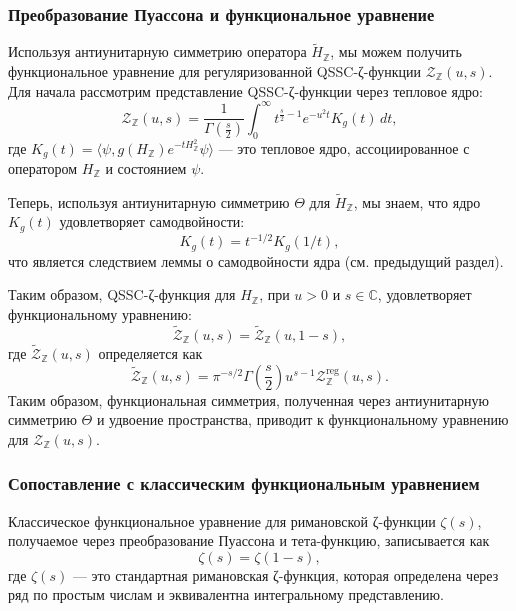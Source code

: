\documentclass{article}
\numberwithin{equation}{section}
\theoremstyle{plain}
\theoremstyle{definition}
\theoremstyle{remark}
\def\infty{∞}\def\partial{∂}\def\sum{Σ}\def\int{∫}%
\begin{document}
\subsubsection{Преобразование Пуассона и функциональное уравнение}
\label{subsubsec:poisson-transformation}

\noindent
Используя антиунитарную симметрию оператора $\widetilde{H}_{\mathbb Z}$,
мы можем получить функциональное уравнение для регуляризованной
QSSC-ζ-функции $\mathcal Z_{\mathbb Z}(u,s)$. Для начала рассмотрим
представление QSSC-ζ-функции через тепловое ядро:
\[
\mathcal Z_{\mathbb Z}(u,s) = \frac{1}{\Gamma\left(\frac{s}{2}\right)}
\int_0^\infty t^{\frac{s}{2} - 1} e^{-u^2 t} K_g(t)\, dt,
\]
где $K_g(t) = \langle\psi, g(H_{\mathbb Z}) e^{-tH_{\mathbb Z}^2} \psi\rangle$ — это тепловое
ядро, ассоциированное с оператором $H_{\mathbb Z}$ и состоянием $\psi$.

Теперь, используя антиунитарную симметрию $\Theta$ для $\widetilde{H}_{\mathbb Z}$,
мы знаем, что ядро $K_g(t)$ удовлетворяет самодвойности:
\[
K_g(t) = t^{-1/2} K_g(1/t),
\]
что является следствием леммы о самодвойности ядра (см. предыдущий раздел).

Таким образом, QSSC-ζ-функция для $H_{\mathbb Z}$, при $u>0$ и $s \in \mathbb C$,
удовлетворяет функциональному уравнению:
\begin{equation}
\label{eq:Z-Z-FE}
\widetilde{\mathcal Z}_{\mathbb Z}(u,s) = \widetilde{\mathcal Z}_{\mathbb Z}(u,1-s),
\end{equation}
где $\widetilde{\mathcal Z}_{\mathbb Z}(u,s)$ определяется как
\[
\widetilde{\mathcal Z}_{\mathbb Z}(u,s) = \pi^{-s/2} \Gamma\left(\frac{s}{2}\right) u^{s-1} \mathcal Z_{\mathbb Z}^{\text{reg}}(u,s).
\]
Таким образом, функциональная симметрия, полученная через антиунитарную симметрию
$\Theta$ и удвоение пространства, приводит к функциональному уравнению
для $\mathcal Z_{\mathbb Z}(u,s)$.

\subsubsection{Сопоставление с классическим функциональным уравнением}
\label{subsubsec:comparison-with-classical}

\noindent
Классическое функциональное уравнение для римановской ζ-функции
$\zeta(s)$, получаемое через преобразование Пуассона и тета-функцию,
записывается как
\[
\zeta(s) = \zeta(1-s),
\]
где $\zeta(s)$ — это стандартная римановская ζ-функция, которая
определена через ряд по простым числам и эквивалентна интегральному
представлению.
\end{document}
